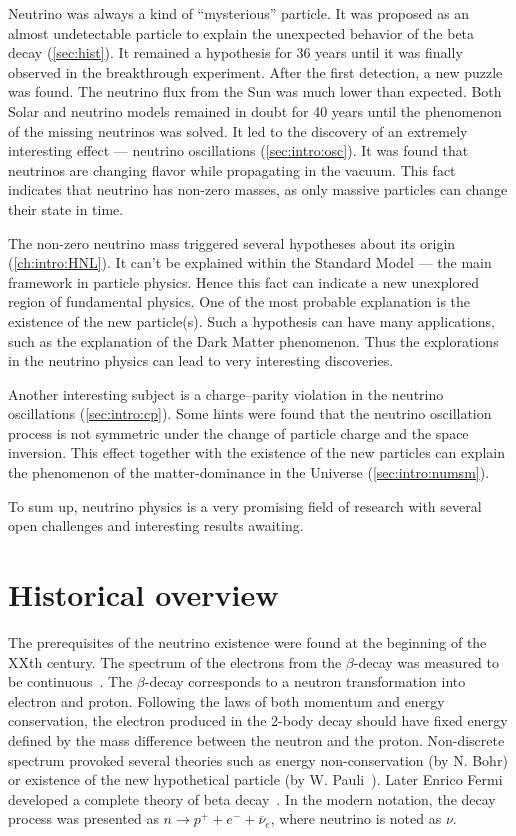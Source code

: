 \documentclass[../main.tex]{subfiles}
\begin{document}
Neutrino was always a kind of ``mysterious'' particle. It was proposed as an almost undetectable particle to explain the unexpected behavior of the beta decay (\autoref{sec:hist}). It remained a hypothesis for 36 years until it was finally observed in the breakthrough experiment. After the first detection, a new puzzle was found. The neutrino flux from the Sun was much lower than expected. Both Solar and neutrino models remained in doubt for 40 years until the phenomenon of the missing neutrinos was solved. It led to the discovery of an extremely interesting effect --- neutrino oscillations (\autoref{sec:intro:osc}). It was found that neutrinos are changing flavor while propagating in the vacuum. This fact indicates that neutrino has non-zero masses, as only massive particles can change their state in time.

The non-zero neutrino mass triggered several hypotheses about its origin (\autoref{ch:intro:HNL}). It can't be explained within the Standard Model --- the main framework in particle physics. Hence this fact can indicate a new unexplored region of fundamental physics. One of the most probable explanation is the existence of the new particle(s). Such a hypothesis can have many applications, such as the explanation of the Dark Matter phenomenon. Thus the explorations in the neutrino physics can lead to very interesting discoveries.

Another interesting subject is a charge--parity violation in the neutrino oscillations (\autoref{sec:intro:cp}). Some hints were found that the neutrino oscillation process is not symmetric under the change of particle charge and the space inversion. This effect together with the existence of the new particles can explain the phenomenon of the matter-dominance in the Universe (\autoref{sec:intro:numsm}).

To sum up, neutrino physics is a very promising field of research with several open challenges and interesting results awaiting.

\section{Historical overview}
\label{sec:hist}
The prerequisites of the neutrino existence were found at the beginning of the XXth century. The spectrum of the electrons from the $\beta$-decay was measured to be continuous~\cite{Chadwick1914}. The $\beta$-decay corresponds to a neutron transformation into electron and proton. Following the laws of both momentum and energy conservation, the electron produced in the 2-body decay should have fixed energy defined by the mass difference between the neutron and the proton. Non-discrete spectrum provoked several theories such as energy non-conservation (by N. Bohr) or existence of the new hypothetical particle (by W. Pauli~\cite{Pauli1930}). Later Enrico Fermi developed a complete theory of beta decay~\cite{Fermi1934}. In the modern notation, the decay process was presented as $n\to p^++e^-+\overline{\nu}_e$, where neutrino is noted as $\nu$.
\end{document}
